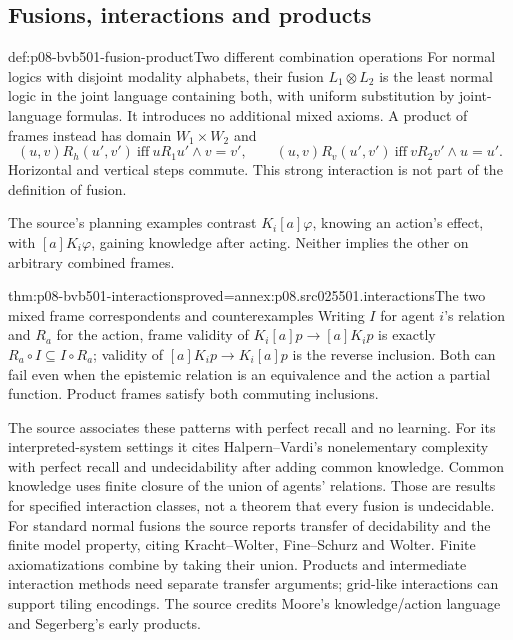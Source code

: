 \subsection{Fusions, interactions and products}
\label{sec:p08-bvb501-combinations}

\begin{hbdefinition}{def:p08-bvb501-fusion-product}{Two different combination operations}
For normal logics with disjoint modality alphabets, their fusion
\(L_1\otimes L_2\) is the least normal logic in the joint language
containing both, with uniform substitution by joint-language formulas.
It introduces no additional mixed axioms. A product of frames instead
has domain \(W_1\times W_2\) and
\[
 (u,v)R_h(u',v')\ \text{iff}\ uR_1u'\land v=v',\qquad
 (u,v)R_v(u',v')\ \text{iff}\ vR_2v'\land u=u'.
\]
Horizontal and vertical steps commute. This strong interaction is not
part of the definition of fusion.
\end{hbdefinition}

The source's planning examples contrast \(K_i[a]\varphi\), knowing
an action's effect, with \([a]K_i\varphi\), gaining knowledge after
acting. Neither implies the other on arbitrary combined frames.

\begin{hbtheorem}{thm:p08-bvb501-interactions}{proved=annex:p08.src025501.interactions}{The two mixed frame correspondents and counterexamples}
Writing \(I\) for agent \(i\)'s relation and \(R_a\) for
the action, frame validity of \(K_i[a]p\to[a]K_ip\) is exactly
\(R_a\circ I\subseteq I\circ R_a\); validity of
\([a]K_ip\to K_i[a]p\) is the reverse inclusion. Both can fail
even when the epistemic relation is an equivalence and the action a
partial function. Product frames satisfy both commuting inclusions.
\end{hbtheorem}

The source associates these patterns with perfect recall and no learning.
For its interpreted-system settings it cites Halpern--Vardi's
nonelementary complexity with perfect recall and undecidability after
adding common knowledge. Common knowledge uses finite closure of the
union of agents' relations. Those are results for specified interaction
classes, not a theorem that every fusion is undecidable. For standard
normal fusions the source reports transfer of decidability and the
finite model property, citing Kracht--Wolter, Fine--Schurz and Wolter.
Finite axiomatizations combine by taking their union. Products and
intermediate interaction methods need separate transfer arguments;
grid-like interactions can support tiling encodings. The source credits
Moore's knowledge/action language and Segerberg's early products.

